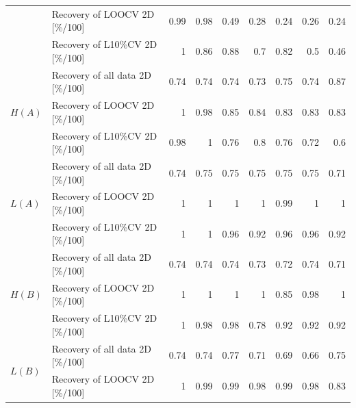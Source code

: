 \documentclass[11pt,oneside,czech,american]{book} %
\theoremstyle{definition} %
\theoremstyle{definition}
\begin{document}
\begin{table}[H]
\begin{tabular}{llrrrrrrr}
	& Recovery of LOOCV 2D [\%/100]    & 0.99          & 0.98          & 0.49          & 0.28         & 0.24          & 0.26          & 0.24           \\
	& Recovery of L10\%CV 2D [\%/100]  & 1             & 0.86          & 0.88          & 0.7          & 0.82          & 0.5           & 0.46           \\ 
	\hline
	\multirow{3}{*}{$H(A)$}    & Recovery of all data 2D [\%/100] & 0.74          & 0.74          & 0.74          & 0.73         & 0.75          & 0.74          & 0.87           \\
	& Recovery of LOOCV 2D [\%/100]    & 1             & 0.98          & 0.85          & 0.84         & 0.83          & 0.83          & 0.83           \\
	& Recovery of L10\%CV 2D [\%/100]  & 0.98          & 1             & 0.76          & 0.8          & 0.76          & 0.72          & 0.6            \\ 
	\hline
	\multirow{3}{*}{$L(A)$}    & Recovery of all data 2D [\%/100] & 0.74          & 0.75          & 0.75          & 0.75         & 0.75          & 0.75          & 0.71           \\
	& Recovery of LOOCV 2D [\%/100]    & 1             & 1             & 1             & 1            & 0.99          & 1             & 1              \\
	& Recovery of L10\%CV 2D [\%/100]  & 1             & 1             & 0.96          & 0.92         & 0.96          & 0.96          & 0.92           \\ 
	\hline
	\multirow{3}{*}{$H(B)$}    & Recovery of all data 2D [\%/100] & 0.74          & 0.74          & 0.74          & 0.73         & 0.72          & 0.74          & 0.71           \\
	& Recovery of LOOCV 2D [\%/100]    & 1             & 1             & 1             & 1            & 0.85          & 0.98          & 1              \\
	& Recovery of L10\%CV 2D [\%/100]  & 1             & 0.98          & 0.98          & 0.78         & 0.92          & 0.92          & 0.92           \\ 
	\hline
	\multirow{3}{*}{$L(B)$}    & Recovery of all data 2D [\%/100] & 0.74          & 0.74          & 0.77          & 0.71         & 0.69          & 0.66          & 0.75           \\
	& Recovery of LOOCV 2D [\%/100]    & 1             & 0.99          & 0.99          & 0.98         & 0.99          & 0.98          & 0.83           \\

\end{tabular}
\end{table}
\end{document}
